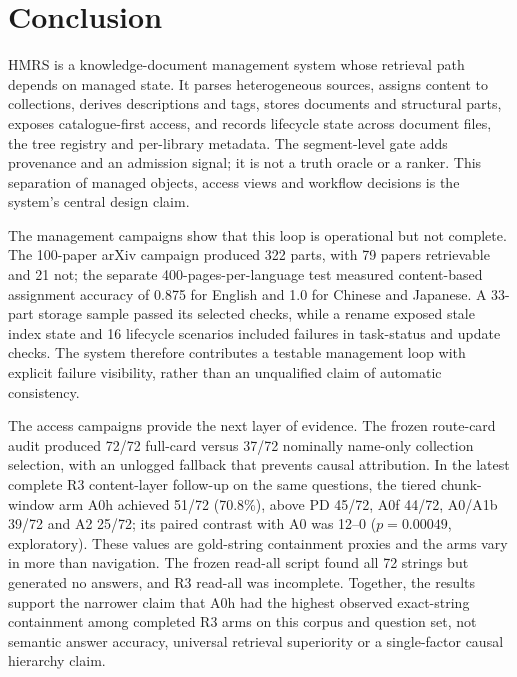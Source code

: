 \section{Conclusion}
\label{sec:conclusion}

HMRS is a knowledge-document management system whose retrieval path depends on
managed state. It parses heterogeneous sources, assigns content to collections,
derives descriptions and tags, stores documents and structural parts, exposes
catalogue-first access, and records lifecycle state across document files, the
tree registry and per-library metadata. The segment-level gate adds provenance
and an admission signal; it is not a truth oracle or a ranker. This separation
of managed objects, access views and workflow decisions is the system's central
design claim.

The management campaigns show that this loop is operational but not complete.
The 100-paper arXiv campaign produced 322 parts, with 79 papers retrievable and
21 not; the separate 400-pages-per-language test measured content-based
assignment accuracy of 0.875 for English and 1.0 for Chinese and Japanese. A
33-part storage sample passed its selected checks, while a rename exposed stale
index state and 16 lifecycle scenarios included failures in task-status and
update checks. The system therefore contributes a testable management loop with
explicit failure visibility, rather than an unqualified claim of automatic
consistency.

The access campaigns provide the next layer of evidence. The frozen route-card
audit produced 72/72 full-card versus 37/72 nominally name-only collection
selection, with an unlogged fallback that prevents causal attribution. In the
latest complete R3 content-layer follow-up on the same questions, the tiered
chunk-window arm A0h achieved 51/72 (70.8\%), above PD 45/72, A0f 44/72, A0/A1b 39/72 and A2 25/72; its paired
contrast with A0 was 12--0 ($p=0.00049$, exploratory). These values are
gold-string containment proxies and the arms vary in more than navigation.
The frozen read-all script found all 72 strings but generated no answers, and
R3 read-all was incomplete. Together, the results support the narrower claim that A0h had the highest
observed exact-string containment among completed R3 arms on this corpus and
question set, not semantic answer accuracy, universal retrieval superiority or
a single-factor causal hierarchy claim.

